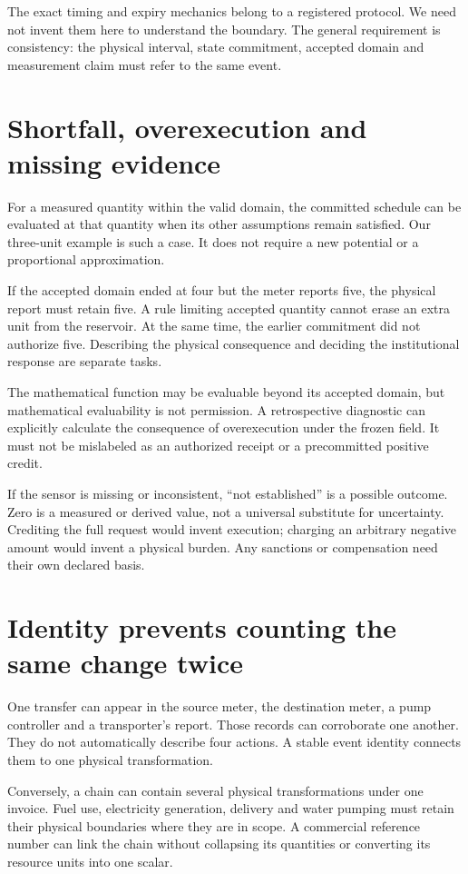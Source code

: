 The exact timing and expiry mechanics belong to a registered protocol. We need not invent them here to understand the boundary. The general requirement is consistency: the physical interval, state commitment, accepted domain and measurement claim must refer to the same event.

\section{Shortfall, overexecution and missing evidence}
For a measured quantity within the valid domain, the committed schedule can be evaluated at that quantity when its other assumptions remain satisfied. Our three-unit example is such a case. It does not require a new potential or a proportional approximation.

If the accepted domain ended at four but the meter reports five, the physical report must retain five. A rule limiting accepted quantity cannot erase an extra unit from the reservoir. At the same time, the earlier commitment did not authorize five. Describing the physical consequence and deciding the institutional response are separate tasks.

The mathematical function may be evaluable beyond its accepted domain, but mathematical evaluability is not permission. A retrospective diagnostic can explicitly calculate the consequence of overexecution under the frozen field. It must not be mislabeled as an authorized receipt or a precommitted positive credit.

If the sensor is missing or inconsistent, ``not established'' is a possible outcome. Zero is a measured or derived value, not a universal substitute for uncertainty. Crediting the full request would invent execution; charging an arbitrary negative amount would invent a physical burden. Any sanctions or compensation need their own declared basis.

\section{Identity prevents counting the same change twice}
One transfer can appear in the source meter, the destination meter, a pump controller and a transporter's report. Those records can corroborate one another. They do not automatically describe four actions. A stable event identity connects them to one physical transformation.

Conversely, a chain can contain several physical transformations under one invoice. Fuel use, electricity generation, delivery and water pumping must retain their physical boundaries where they are in scope. A commercial reference number can link the chain without collapsing its quantities or converting its resource units into one scalar.

